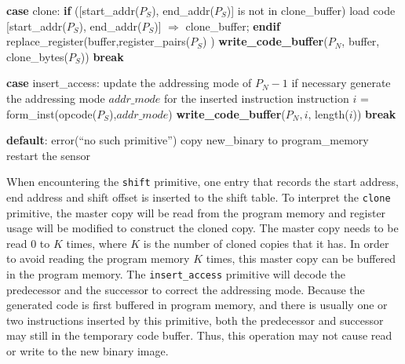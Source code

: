 \begin{algorithm}
\begin{algorithmic}[1]
\STATE \hspace{5 mm} {\bf case} clone:
\STATE \hspace{10 mm} {\bf if} ([start\_addr($P_S$), end\_addr($P_S$)] is not in clone\_buffer)
\STATE \hspace{15 mm} load code [start\_addr($P_S$), end\_addr($P_S$)] $\Rightarrow$  clone\_buffer;
\STATE \hspace{10 mm} {\bf endif}
\STATE \hspace{10 mm} replace\_register(buffer,register\_pairs($P_S$) )
\STATE \hspace{10 mm} {\bf write\_code\_buffer}($P_N$, buffer, clone\_bytes($P_S$))
\STATE \hspace{10 mm} {\bf break}

\STATE \hspace{5 mm} {\bf case} insert\_access:
\STATE \hspace{10mm} update the addressing mode of $P_N-1$ if necessary
\STATE \hspace{10mm} generate the addressing mode $addr\_mode$ for the inserted instruction
\STATE \hspace{10mm} instruction $i$ = form\_inst(opcode($P_S$),$addr\_mode$)
\STATE \hspace{10mm} {\bf write\_code\_buffer}($P_N, i$, length($i$))
\STATE \hspace{10mm} {\bf break}

\STATE \hspace{5mm} {\bf default}:
\STATE \hspace{10mm} error(``no such primitive'')
\ENDFOR
\STATE copy new\_binary to program\_memory
\STATE restart the sensor
\end{algorithmic}
\caption{Primitive interpretation and code reconstruction.}
\label{decode}
\end{algorithm}

When encountering the {\tt shift} primitive, one entry that records the start address, end address
and shift offset is inserted to the shift table. To interpret the {\tt clone} primitive, the
master copy will be read from the program memory and register usage will be modified
to construct the cloned copy. The master copy needs to be read 0 to $K$ times, where
$K$ is the number of cloned copies that it has. In order to avoid reading the program
memory $K$ times, this master copy can be buffered in the program memory.
The {\tt insert\_access} primitive will decode the predecessor
and the successor to correct the addressing mode. Because the generated code is first
buffered in program memory, and there is usually one or two instructions inserted by
this primitive, both the predecessor and successor may still in the temporary code buffer.
Thus, this operation may not cause read or write to the new binary image.

